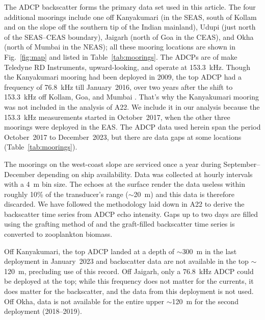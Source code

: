 \documentclass[authoryear,review,11pt]{elsarticle}
\begin{document}
The ADCP backscatter forms the primary data set used in this article.  The four additional moorings include one off Kanyakumari (in the SEAS, south of Kollam and on the slope off the southern tip of the Indian mainland), Udupi (just north of the SEAS--CEAS boundary), Jaigarh (north of Goa in the CEAS), and Okha (north of Mumbai in the NEAS); all these mooring locations are shown in Fig.~\ref{fig:map} and listed in Table~\ref{tab:moorings}.  The ADCPs are of make Teledyne RD Instruments, upward-looking, and operate at 153.3~kHz.  Though the Kanyakumari mooring had been deployed in 2009, the top ADCP had a frequency of 76.8~kHz till January~2016, over two years after the shift to 153.3~kHz off Kollam, Goa, and Mumbai  \citep{chaudhuri2020observed}.  That's why the Kanyakumari mooring was not included in the analysis of A22.  We include it in our analysis because the 153.3~kHz measurements started in October~2017, when the other three moorings were deployed in the EAS. The ADCP data used herein span the period October~2017 to December~2023, but there are data gaps at some locations (Table~\ref{tab:moorings}). 

The moorings on the west-coast slope are serviced once a year during September--December depending on ship availability. Data was collected at hourly intervals with a 4~m bin size. The echoes at the surface render the data useless within roughly 10\% of the transducer's range ($\sim$20~m) and this data is therefore discarded.  We have followed the methodology laid down in A22 to derive the backscatter time series from ADCP echo intensity. Gaps up to two days are filled using the grafting method of \citet{mukhopadhyay2017st} and the graft-filled backscatter time series is converted to zooplankton biomass.

Off Kanyakumari, the top ADCP landed at a depth of $\sim$300~m in the last deployment in January~2023 and backscatter data are not available in the top $\sim$120~m, precluding use of this record.  Off Jaigarh, only a 76.8~kHz ADCP could be deployed at the top; while this frequency does not matter for the currents, it does matter for the backscatter, and the data from this deployment is not used. Off Okha, data is not available for the entire upper $\sim$120~m for the
second deployment (2018--2019).
\end{document}
